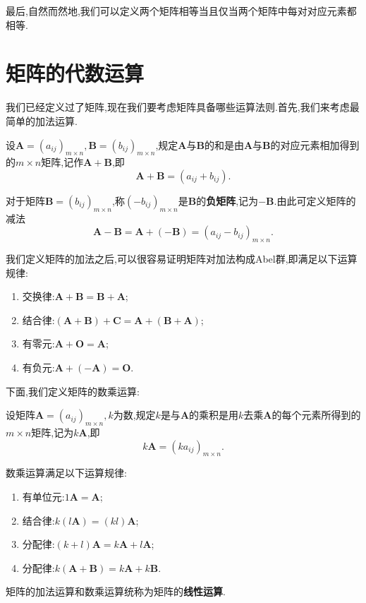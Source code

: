 最后,自然而然地,我们可以定义两个矩阵相等当且仅当两个矩阵中每对对应元素都相等.

\section{矩阵的代数运算}
我们已经定义过了矩阵,现在我们要考虑矩阵具备哪些运算法则.首先,我们来考虑最简单的加法运算.
\begin{definition}
	设$\mathbf{A}=\left(a_{ij}\right)_{m\times n},\mathbf{B}=\left(b_{ij}\right)_{m\times n}$,规定$\mathbf{A}$与$\mathbf{B}$的和是由$\mathbf{A}$与$\mathbf{B}$的对应元素相加得到的$m\times n$矩阵,记作$\mathbf{A+B}$,即
	\[
		\mathbf{A+B}=\left(a_{ij}+b_{ij}\right).
	\]
\end{definition}
对于矩阵$\mathbf{B}=\left(b_{ij}\right)_{m\times n}$,称$\left(-b_{ij}\right)_{m\times n}$是$\mathbf{B}$的\textbf{负矩阵},记为$\mathbf{-B}$.由此可定义矩阵的减法
\[
	\mathbf{A-B}=\mathbf{A}+\left(-\mathbf{B}\right)=\left(a_{ij}-b_{ij}\right)_{m\times n}.
\]

我们定义矩阵的加法之后,可以很容易证明矩阵对加法构成Abel群,即满足以下运算规律:
\begin{enumerate}
	\item 交换律:$\mathbf{A+B=B+A}$;
	\item 结合律:$\mathbf{(A+B)+C=A+(B+A)}$;
	\item 有零元:$\mathbf{A+O=A}$;
	\item 有负元:$\mathbf{A+(-A)=O}$.
\end{enumerate}

下面,我们定义矩阵的数乘运算:
\begin{definition}
	设矩阵$\mathbf{A}=\left(a_{ij}\right)_{m\times n},k$为数,规定$k$是与$\mathbf{A}$的乘积是用$k$去乘$\mathbf{A}$的每个元素所得到的$m\times n$矩阵,记为$k\mathbf{A}$,即
	\[
		k\mathbf{A}=(ka_{ij})_{m\times n}.
	\]
\end{definition}
数乘运算满足以下运算规律:
\begin{enumerate}
	\item 有单位元:$1\mathbf{A}=\mathbf{A}$;
	\item 结合律:$k(l\mathbf{A})=(kl)\mathbf{A}$;
	\item 分配律:$(k+l)\mathbf{A}=k\mathbf{A}+l\mathbf{A}$;
	\item 分配律:$k(\mathbf{A+B})=k\mathbf{A}+k\mathbf{B}$.
\end{enumerate}
矩阵的加法运算和数乘运算统称为矩阵的\textbf{线性运算}.

